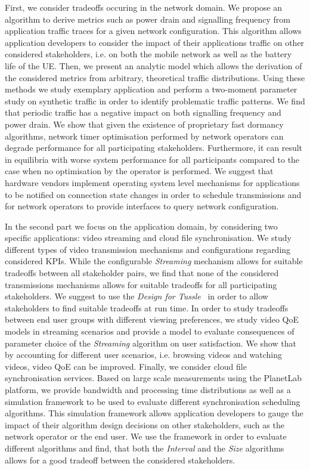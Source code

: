 First, we consider tradeoffs occuring in the network domain.
We propose an algorithm to derive metrics such as power drain and signalling frequency from application traffic traces for a given network configuration.
This algorithm allows application developers to consider the impact of their applications  traffic on other considered stakeholders, i.e. on both the mobile network as well as the battery life of the \gls{UE}.
Then, we present an analytic model which allows the derivation of the considered metrics from arbitrary, theoretical traffic distributions.
Using these methods we study exemplary application and perform a two-moment parameter study on synthetic traffic in order to identify problematic traffic patterns.
We find that periodic traffic has a negative impact on both signalling frequency and power drain.
We show that given the existence of proprietary fast dormancy algorithms, network timer optimisation performed by network operators can degrade performance for all participating stakeholders. 
Furthermore, it can result in equilibria with worse system performance for all participants compared to the case when no optimisation by the operator is performed.  
We suggest that hardware vendors implement operating system level mechanisms for applications to be notified on connection state changes in order to schedule transmissions and for network operators to provide interfaces to query network configuration.

In the second part we focus on the application domain, by considering two specific applications: video streaming and cloud file synchronisation.
We study different types of video transmission mechanisms and configurations regarding considered \glspl{KPI}.
While the configurable \emph{Streaming} mechanism allows for suitable tradeoffs between all stakeholder pairs, we find that none of the considered transmissions mechanisms allows for suitable tradeoffs for all participating stakeholders.
We suggest to use the \emph{Design for Tussle}~\cite{Clark2005} in order to allow stakeholders to find suitable tradeoffs at run time.
In order to study tradeoffs between end user groups with different viewing preferences, we study video \gls{QoE} models in streaming scenarios and provide a model to evaluate consequences of parameter choice of the \emph{Streaming} algorithm on user satisfaction.
We show that by accounting for different user scenarios, i.e. browsing videos and watching videos, video \gls{QoE} can be improved.
Finally, we consider cloud file synchronisation services.
Based on large scale measurements using the PlanetLab platform, we provide bandwidth and processing time distributions as well as a simulation framework to be used to evaluate different synchronisation scheduling algorithms.
This simulation framework allows application developers to gauge the impact of their algorithm design decisions on other stakeholders, such as the network operator or the end user.
We use the framework in order to evaluate different algorithms and find, that both the \emph{Interval} and the \emph{Size} algorithms allows for a good tradeoff between the considered stakeholders.

